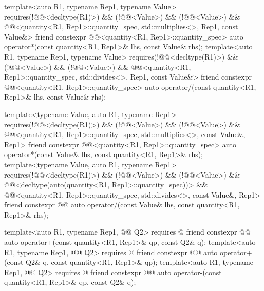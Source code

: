 \begin{codeblock}
{{  template<auto R1, typename Rep1, typename Value>
    requires(!@@<decltype(R1)>) &&
            (!@@<Value>) && (!@@<Value>) &&
            @@<quantity<R1, Rep1>::quantity_spec, std::multiplies<>, Rep1, const Value&>
  friend constexpr @@<quantity<R1, Rep1>::quantity_spec> auto operator*(const quantity<R1, Rep1>& lhs,
                                                                                 const Value& rhs);
  template<auto R1, typename Rep1, typename Value>
    requires(!@@<decltype(R1)>) &&
            (!@@<Value>) && (!@@<Value>) &&
            @@<quantity<R1, Rep1>::quantity_spec, std::divides<>, Rep1, const Value&>
  friend constexpr @@<quantity<R1, Rep1>::quantity_spec> auto operator/(const quantity<R1, Rep1>& lhs,
                                                                                 const Value& rhs);

  template<typename Value, auto R1, typename Rep1>
    requires(!@@<decltype(R1)>) &&
            (!@@<Value>) && (!@@<Value>) &&
            @@<quantity<R1, Rep1>::quantity_spec, std::multiplies<>, const Value&, Rep1>
  friend constexpr @@<quantity<R1, Rep1>::quantity_spec> auto operator*(const Value& lhs,
                                                                                 const quantity<R1, Rep1>& rhs);
  template<typename Value, auto R1, typename Rep1>
    requires(!@@<decltype(R1)>) &&
            (!@@<Value>) && (!@@<Value>) &&
            @@<decltype(auto(quantity<R1, Rep1>::quantity_spec))> &&
            @@<quantity<R1, Rep1>::quantity_spec, std::divides<>, const Value&, Rep1>
  friend constexpr @@ auto operator/(const Value& lhs, const quantity<R1, Rep1>& rhs);

  template<auto R1, typename Rep1, @@ Q2>
    requires @\seebelownc@
  friend constexpr @@ auto operator+(const quantity<R1, Rep1>& qp, const Q2& q);
  template<auto R1, typename Rep1, @@ Q2>
    requires @\seebelownc@
  friend constexpr @@ auto operator+(const Q2& q, const quantity<R1, Rep1>& qp);
  template<auto R1, typename Rep1, @@ Q2>
    requires @\seebelownc@
  friend constexpr @@ auto operator-(const quantity<R1, Rep1>& qp, const Q2& q);

}}
\end{codeblock}
